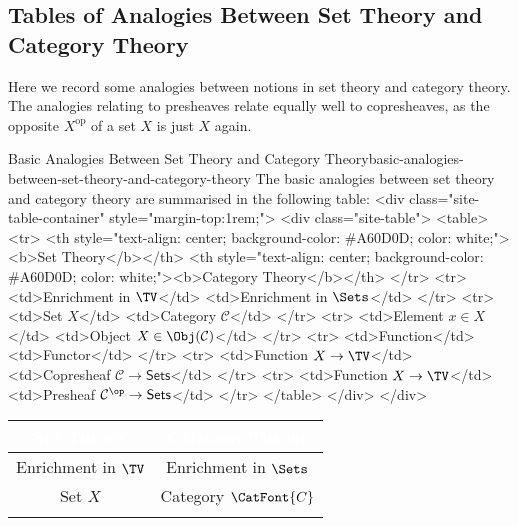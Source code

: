 \subsection{Tables of Analogies Between Set Theory and Category Theory}\label{subsection-table-of-analogies-between-set-theory-and-category-theory}
Here we record some analogies between notions in set theory and category theory. The analogies relating to presheaves relate equally well to copresheaves, as the opposite $X^{\mathrm{op}}$ of a set $X$ is just $X$ again.
\begin{remark}{Basic Analogies Between Set Theory and Category Theory}{basic-analogies-between-set-theory-and-category-theory}%
    The basic analogies between set theory and category theory are summarised in the following table:
    <div class="site-table-container" style="margin-top:1rem;">
      <div class="site-table">
        <table>
          <tr>
            <th style="text-align: center; background-color: #A60D0D; color: white;"><b>Set Theory</b></th>
            <th style="text-align: center; background-color: #A60D0D; color: white;"><b>Category Theory</b></th>
          </tr>
          <tr>
            <td>Enrichment in $\TV$</td>
            <td>Enrichment in $\Sets$</td>
          </tr>
          <tr>
            <td>Set $X$</td>
            <td>Category $\mathcal{C}$</td>
          </tr>
          <tr>
            <td>Element $x\in X$</td>
            <td>Object $X\in\Obj(\mathcal{C})$</td>
          </tr>
          <tr>
            <td>Function</td>
            <td>Functor</td>
          </tr>
          <tr>
            <td>Function $X\to\TV$</td>
            <td>Copresheaf $\mathcal{C}\to\mathsf{Sets}$</td>
          </tr>
          <tr>
            <td>Function $X\to\TV$</td>
            <td>Presheaf $\mathcal{C}^{\op}\to\mathsf{Sets}$</td>
          </tr>
        </table>
      </div>
    </div>
    \begingroup%
    \renewcommand{\arraystretch}{1.2}
    \begin{center}
        \begin{tabular}{|c|c|}\hline\rowcolor{darkRed}
            \textcolor{white}{\textbf{\textsc{Set Theory}}} & \textcolor{white}{\textsc{Category Theory}} \\\hline\rowcolor{backgroundColor}
            Enrichment in $\TV$                    & Enrichment in $\Sets$                       \\\rowcolor{black!05!backgroundColor}
            Set $X$                                & Category $\CatFont{C}$                      \\\rowcolor{backgroundColor}

\end{tabular}
\end{center}
\end{remark}
